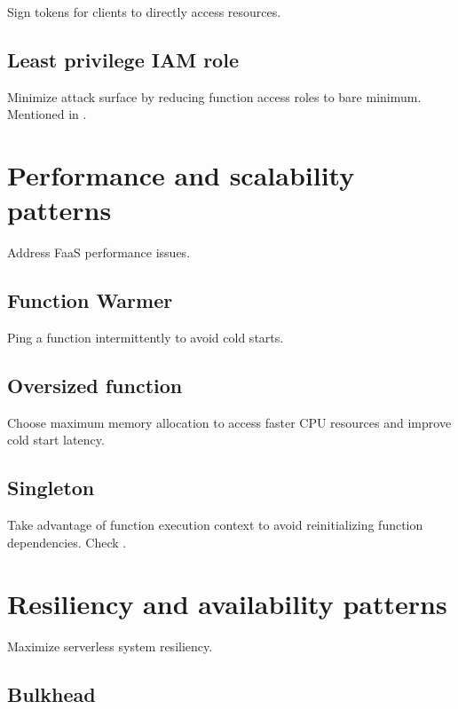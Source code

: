 Sign tokens for clients to directly access resources.

\subsection{Least privilege IAM role} \label{subsec:LeastprivilegeIAMrole}

Minimize attack surface by reducing function access roles to bare minimum. Mentioned in \textcite{aws18serverlessLens}.

\section{Performance and scalability patterns} \label{sec:perfPatterns}

Address FaaS performance issues.

\subsection{Function Warmer} \label{subsec:FunctionWarmer}

Ping a function intermittently to avoid cold starts.

\subsection{Oversized function} \label{subsec:OversizedFunction}

Choose maximum memory allocation to access faster CPU resources and improve cold start latency.

\subsection{Singleton} \label{subsec:Singleton}

Take advantage of function execution context to avoid reinitializing function dependencies. Check \textcite{aws18serverlessLens}.

\section{Resiliency and availability patterns} \label{sec:resiliencyPatterns}

Maximize serverless system resiliency.

\subsection{Bulkhead} \label{subsec:Bulkhead}

